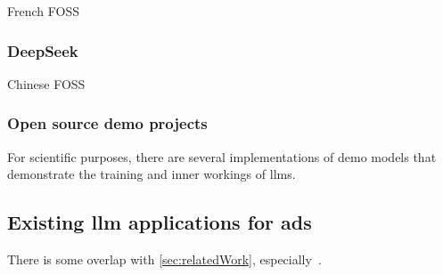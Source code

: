 French FOSS

\subsubsection*{DeepSeek}

Chinese  FOSS

\subsubsection*{Open source demo projects}

For scientific purposes, there are several implementations of demo models that demonstrate the
training and inner workings of \acrshort{llms}.



\subsection{Existing \acrshort{llm} applications for \acrshort{ads}}

There is some overlap with \cref{sec:relatedWork}, especially~\cite{autoSceneGen}.


